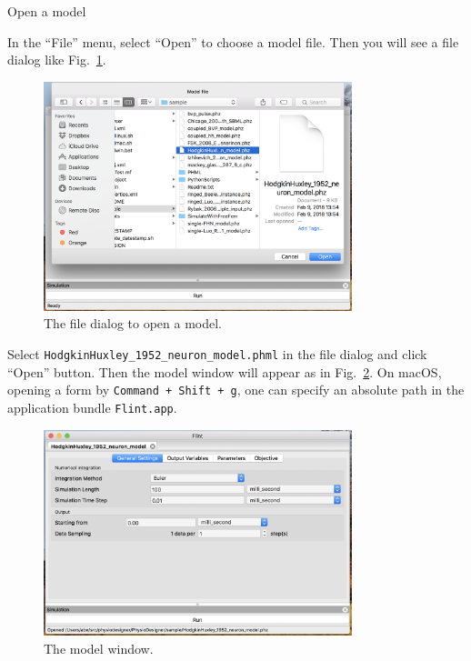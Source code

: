 \documentclass[a4paper,10pt]{report}
\begin{document}
\begin{description}
\item[{Open a model}] 
\end{description}
In the ``File'' menu, select ``Open'' to choose a model file. Then you will see
a file dialog like Fig.~\ref{fig:orgff7c096}.

\begin{figure}[htbp]
\centering
\includegraphics[width=0.8\textwidth]{image/open-model.png}
\caption{\label{fig:orgff7c096}The file dialog to open a model.}
\end{figure}

Select \texttt{HodgkinHuxley\_1952\_neuron\_model.phml} in the file dialog and click ``Open'' button.
Then the model window will appear as in Fig.~\ref{fig:org8130d32}.
On macOS, opening a form by \texttt{Command + Shift + g}, one can
specify an absolute path in the application bundle \texttt{Flint.app}.

\begin{figure}[htbp]
\centering
\includegraphics[width=0.8\textwidth]{image/hh.png}
\caption{\label{fig:org8130d32}The model window.}
\end{figure}
\end{document}

